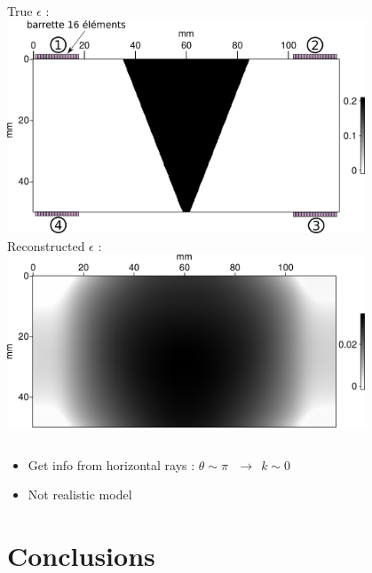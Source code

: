 \documentclass[10pt,xcolor=x11names,compress, notes=show]{beamer}%
\begin{document}
\begin{frame}{\insertsectionhead}
\begin{columns}
\begin{figure}
		\end{figure}
	\end{columns}	
	\vspace{0.2cm}
	\begin{columns}
		\centering
		True $\epsilon$ : \\[0.2cm]
		\includegraphics[width=0.8\textwidth]{img/anisotrope/epsilon_true.png}\\
		
		\centering
		Reconstructed $\epsilon$ : \\[0.2cm]
		\includegraphics[width=0.8\textwidth]{img/anisotrope/epsilon_final.png}\\		
	\end{columns}	
\begin{itemize}
	\item Get info from horizontal rays : $\theta\sim \pi~~~\rightarrow~~k\sim 0$
	\item Not realistic model
\end{itemize}
\end{frame}


\section{Conclusions}
\end{document}
